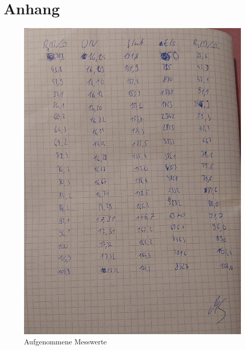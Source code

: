 \newpage
\section{Anhang}
\label{sec:anhang}
\begin{figure}[h!]
  \centering
  \includegraphics[scale=0.3]{fig/messw.jpeg}
  \caption{Aufgenommene Messwerte}
  \label{abb:mess1}
\end{figure}

